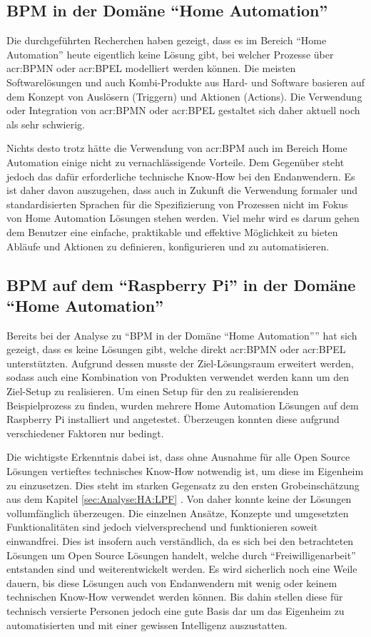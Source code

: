 \subsection{BPM in der Domäne "`Home Automation"'}
Die durchgeführten Recherchen haben gezeigt, dass es im Bereich "`Home Automation"' heute eigentlich keine Lösung gibt, bei welcher Prozesse über \gls{acr:BPMN} oder \gls{acr:BPEL} modelliert werden können. Die meisten Softwarelösungen und auch Kombi-Produkte aus Hard- und Software basieren auf dem Konzept von Auslösern (Triggern) und Aktionen (Actions). Die Verwendung oder Integration von \gls{acr:BPMN} oder \gls{acr:BPEL} gestaltet sich daher aktuell noch als sehr schwierig.

Nichts desto trotz hätte die Verwendung von \gls{acr:BPM} auch im Bereich Home Automation einige nicht zu vernachlässigende Vorteile. Dem Gegenüber steht jedoch das dafür erforderliche technische Know-How bei den Endanwendern. Es ist daher davon auszugehen, dass auch in Zukunft die Verwendung formaler und standardisierten Sprachen für die Spezifizierung von Prozessen nicht im Fokus von Home Automation Lösungen stehen werden. Viel mehr wird es darum gehen dem Benutzer eine einfache, praktikable und effektive Möglichkeit zu bieten Abläufe und Aktionen zu definieren, konfigurieren und zu automatisieren.

\subsection{BPM auf dem "`Raspberry Pi"' in der Domäne "`Home Automation"'}\label{subsec:Fazit:BPMN:RPI:HA}
Bereits bei der Analyse zu "`BPM in der Domäne "`Home Automation"'"' hat sich gezeigt, dass es keine Lösungen gibt, welche direkt \gls{acr:BPMN} oder \gls{acr:BPEL} unterstützten. Aufgrund dessen musste der Ziel-Lösungsraum erweitert werden, sodass auch eine Kombination von Produkten verwendet werden kann um den Ziel-Setup zu realisieren. Um einen Setup für den zu realisierenden Beispielprozess zu finden, wurden mehrere Home Automation Lösungen auf dem Raspberry Pi installiert und angetestet. Überzeugen konnten diese aufgrund verschiedener Faktoren nur bedingt.

Die wichtigste Erkenntnis dabei ist, dass ohne Ausnahme für alle Open Source Lösungen vertieftes technisches Know-How notwendig ist, um diese im Eigenheim zu einzusetzen. Dies steht im starken Gegensatz zu den ersten Grobeinschätzung aus dem Kapitel \ref{sec:Analyse:HA:LPF} . Von daher konnte keine der Lösungen vollumfänglich überzeugen. Die einzelnen Ansätze, Konzepte und umgesetzten Funktionalitäten sind jedoch vielversprechend und funktionieren soweit einwandfrei. Dies ist insofern auch verständlich, da es sich bei den betrachteten Lösungen um Open Source Lösungen handelt, welche durch "`Freiwilligenarbeit"' entstanden sind und weiterentwickelt werden. Es wird sicherlich noch eine Weile dauern, bis diese Lösungen auch von Endanwendern mit wenig oder keinem technischen Know-How verwendet werden können. Bis dahin stellen diese für technisch versierte Personen jedoch eine gute Basis dar um das Eigenheim zu automatisierten und mit einer gewissen Intelligenz auszustatten.

